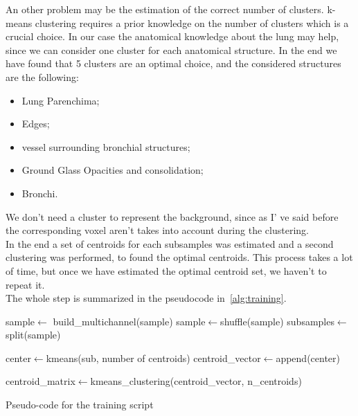 	An other problem may be the estimation of the correct number of clusters. k-means clustering requires a prior knowledge on the number of clusters which is a crucial choice. In our case the anatomical knowledge about the lung may help, since we can consider one cluster for each anatomical structure. In the end we have found that 5 clusters are an optimal choice, and the considered structures are the following: 
	\begin{itemize}
		\item Lung Parenchima;
		
		\item Edges;
		
		\item vessel surrounding bronchial structures;
		
		\item Ground Glass Opacities and consolidation;
		
		\item Bronchi.

	\end{itemize}

	
	We don't need a cluster to represent the background, since as I' ve said before the corresponding voxel aren't takes into account during the clustering.\\
	In the end a set of centroids for each subsamples was estimated and a second clustering was performed, to found the optimal centroids. 
	This process takes a lot of time, but once we have estimated the optimal centroid set, we haven't to repeat it.\\
	
	The whole step is summarized in the pseudocode in \figurename\,\ref{alg:training}.
		
		
	\begin{algorithm}
	
	\SetAlgoLined
	\DontPrintSemicolon
	
	\;
	
	\;
	sample$\leftarrow$ build\_multichannel(sample)\;
	sample$\leftarrow$shuffle(sample)\;
	subsamples$\leftarrow$split(sample)\;
	
	{
		center$\leftarrow$kmeans(sub, number of centroids)\;
		centroid\_vector$\leftarrow$append(center)
		
	}\;

	centroid\_matrix$\leftarrow$kmeans\_clustering(centroid\_vector, n\_centroids)\;
	
	\caption{Pseudo-code for the training script}\label{alg:training}
	
\end{algorithm}

	
